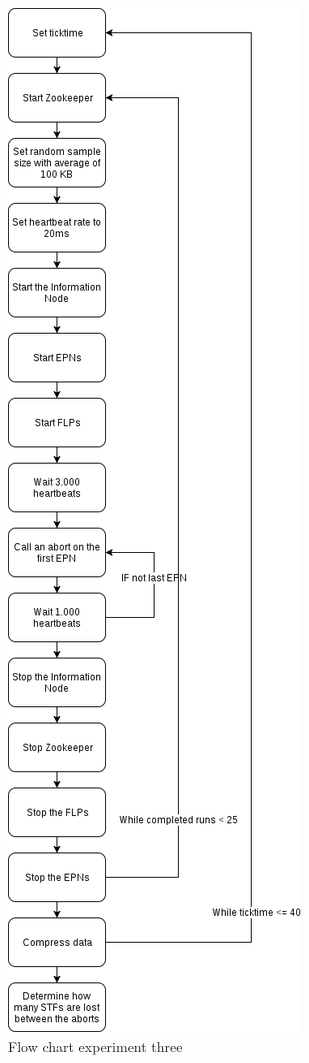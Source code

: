 \begin{figure}[htb]
    \centering
    \includegraphics[scale=0.3]{./graphics/ex3.png}
    \caption{Flow chart experiment three}
    \label{fig:FlowChart3}
\end{figure}

